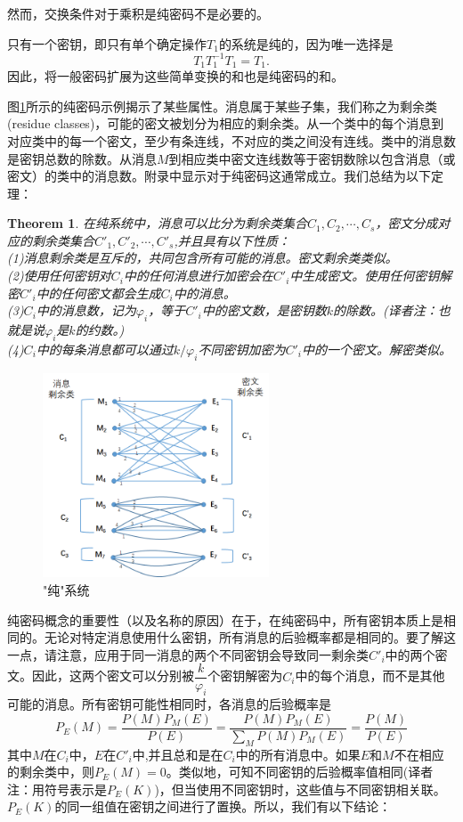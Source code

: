 \documentclass[]{article}
\newtheorem{theorem}{Theorem}
\begin{document}
然而，交换条件对于乘积是纯密码不是必要的。


只有一个密钥，即只有单个确定操作$T_1$的系统是纯的，因为唯一选择是
\[T_1T^{-1}_1T_1=T_1.\]
因此，将一般密码扩展为这些简单变换的和也是纯密码的和。

图\ref{Fig:fig4}所示的纯密码示例揭示了某些属性。消息属于某些子集，我们称之为剩余类(residue classes)，可能的密文被划分为相应的剩余类。从一个类中的每个消息到对应类中的每一个密文，至少有条连线，不对应的类之间没有连线。类中的消息数是密钥总数的除数。从消息$M$到相应类中密文连线数等于密钥数除以包含消息（或密文）的类中的消息数。附录中显示对于纯密码这通常成立。我们总结为以下定理：

\begin{theorem}\label{source:theorem3}
	在纯系统中，消息可以比分为剩余类集合$C_1,C_2,\cdots,C_s$，密文分成对应的剩余类集合$C'_1,C'_2,\cdots,C'_s$,并且具有以下性质：\\
	(1)消息剩余类是互斥的，共同包含所有可能的消息。密文剩余类类似。\\
	(2)使用任何密钥对$C_i$中的任何消息进行加密会在$C'_i$中生成密文。使用任何密钥解密$C'_i$中的任何密文都会生成$C_i$中的消息。\\
	(3)$C_i$中的消息数，记为$\varphi_i$，等于$C'_i$中的密文数，是密钥数$k$的除数。(译者注：也就是说$\varphi_i$是$k$的约数。)\\
	(4)$C_i$中的每条消息都可以通过$k/\varphi_i$不同密钥加密为$C'_i$中的一个密文。解密类似。
\end{theorem}

\begin{figure}[htbp]
	\centering
	\includegraphics[width=0.6\textwidth]{pure-system.png}
	\caption{"纯"系统}
	\label{Fig:fig4}
\end{figure}

纯密码概念的重要性（以及名称的原因）在于，在纯密码中，所有密钥本质上是相同的。无论对特定消息使用什么密钥，所有消息的后验概率都是相同的。要了解这一点，请注意，应用于同一消息的两个不同密钥会导致同一剩余类$C'_i$中的两个密文。因此，这两个密文可以分别被$\dfrac{k}{\varphi_i}$个密钥解密为$C_i$中的每个消息，而不是其他可能的消息。所有密钥可能性相同时，各消息的后验概率是
\[P_E(M)=\frac{P(M)P_M(E)}{P(E)}= \frac{P(M)P_M(E)}{\sum_M P(M)P_M(E)} =  \frac{P(M)}{P(E)}\]
其中$M$在$C_i$中，$E$在$C'_i$中,并且总和是在$C_i$中的所有消息中。如果$E$和$M$不在相应的剩余类中，则$P_E(M)=0$。类似地，可知不同密钥的后验概率值相同(译者注：用符号表示是$P_E(K)$)，但当使用不同密钥时，这些值与不同密钥相关联。$P_E(K)$的同一组值在密钥之间进行了置换。所以，我们有以下结论：
\end{document}
